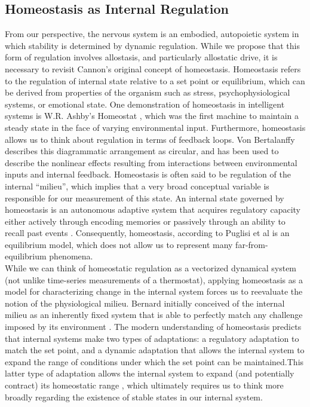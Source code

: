 \documentclass{sigchi}
\begin{document}
\subsection{Homeostasis as Internal Regulation}
From our perspective, the nervous system is an embodied, autopoietic system in which stability is determined by dynamic regulation. While we propose that this form of regulation involves allostasis, and particularly allostatic drive, it is necessary to revisit Cannon’s \cite{Cannon:1930:TWB} original concept of homeostasis. Homeostasis refers to the regulation of internal state relative to a set point or equilibrium, which can be derived from properties of the organism such as stress, psychophysiological systems, or emotional state. One demonstration of homeostasis in intelligent systems is W.R. Ashby’s Homeostat \cite{Ashby:1960:DFB}, which was the first machine to maintain a steady state in the face of varying environmental input. Furthermore, homeostasis allows us to think about regulation in terms of feedback loops. Von Bertalanffy \cite{Bertalanffy:1968:GST} describes this diagrammatic arrangement as circular, and has been used to describe the nonlinear effects resulting from interactions between environmental inputs and internal feedback. Homeostasis is often said to be regulation of the internal “milieu”, which implies that a very broad conceptual variable is responsible for our measurement of this state. An internal state governed by homeostasis is an autonomous adaptive system that acquires regulatory capacity either actively through encoding memories or passively through an ability to recall past events \cite{Dworkin:1993:LPR}.  Consequently, homeostasis, according to Puglisi et al \cite{puglisi} is an equilibrium model, which does not allow us to represent many far-from-equilibrium phenomena.\\
While we can think of homeostatic regulation as a vectorized dynamical system (not unlike time-series measurements of a thermostat), applying homeostasis as a model for characterizing change in the internal system forces us to reevaluate the notion of the physiological milieu. Bernard initially conceived of the internal milieu as an inherently fixed system that is able to perfectly match any challenge imposed by its environment \cite{gross}. The modern understanding of homeostasis predicts that internal systems make two types of adaptations: a regulatory adaptation to match the set point, and a dynamic adaptation that allows the internal system to expand the range of conditions under which the set point can be maintained.This latter type of adaptation allows the internal system to expand (and potentially contract) its homeostatic range \cite{davies}, which ultimately requires us to think more broadly regarding the existence of stable states in our internal system.
\end{document}
